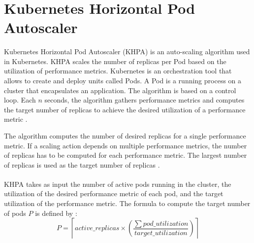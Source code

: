 \section{Kubernetes Horizontal Pod Autoscaler}
\label{sec:04_background_khpa}
\paragraph{}
Kubernetes Horizontal Pod Autoscaler (KHPA) is an auto-scaling algorithm used in Kubernetes.
KHPA scales the number of replicas per Pod based on the utilization of performance metrics.
Kubernetes is an orchestration tool that allows to create and deploy units called Pods. A Pod is a running process on a cluster that encapsulates an application.
The algorithm is based on a control loop. Each $n$ seconds, the algorithm gathers performance metrics and computes the target number of replicas to achieve the desired utilization of a performance metric \cite{Casalicchio2017AutoScaleCont}.


The algorithm computes the number of desired replicas for a single performance metric. If a scaling action depends on multiple performance metrics, the number of replicas has to be computed for each performance metric. The largest number of replicas is used as the target number of replicas \cite{Kubernetes2021Docs}.


\paragraph{}
KHPA takes as input the number of active pods running in the cluster, the utilization of the desired performance metric of each pod, and the target utilization of the performance metric.
The formula to compute the target number of pods $P$ is defined by \cite{Kubernetes2021Docs}:
\begin{equation}
P = \left \lceil active\_replicas \times \left ( \frac{\sum pod\_utilization}{target\_utilization} \right ) \right \rceil
\label{eq:04_background_khpa_equation}
\end{equation}

